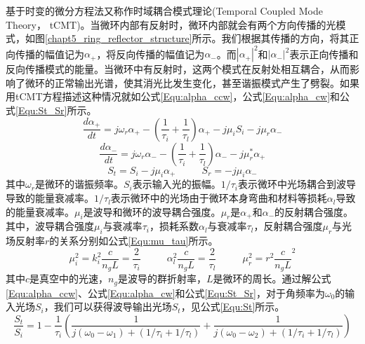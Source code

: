 基于时变的微分方程法又称作时域耦合模式理论(Temporal Coupled Mode Theory， tCMT)。当微环内部有反射时，微环内部就会有两个方向传播的光模式，如图\ref{chapt5_ring_reflector_structure}所示。我们根据其传播的方向，将其正向传播的幅值记为$\alpha_+$，将反向传播的幅值记为$\alpha_-$。而$|\alpha_+|^2$和$|\alpha_-|^2$表示正向传播和反向传播模式的能量。当微环中有反射时，这两个模式在反射处相互耦合，从而影响了微环的正常输出光谱，使其消光比发生变化，甚至谐振模式产生了劈裂。如果用tCMT方程描述这种情况就如公式\ref{Equ:alpha_ccw}，公式\ref{Equ:alpha_cw}和公式\ref{Equ:St_Sr}所示\cite{Li2016design}。
\begin{equation}
\label{Equ:alpha_ccw}
\frac{d\alpha_+}{dt}=j\omega_r\alpha_+-\left(\frac{1}{\tau_i}+\frac{1}{\tau_l}\right)\alpha_+-j\mu_iS_i-j\mu_r\alpha_-
\end{equation}
\begin{equation}
\label{Equ:alpha_cw}
\frac{d\alpha_-}{dt}=j\omega_r\alpha_--\left(\frac{1}{\tau_i}+\frac{1}{\tau_l}\right)\alpha_--j\mu_r^*\alpha_+
\end{equation}
\begin{equation}
\label{Equ:St_Sr}
S_t = S_i-j\mu_i\alpha_+ ~~~~~~~~~~~~ S_r = -j\mu_i\alpha_-
\end{equation}
其中$\omega_r$是微环的谐振频率。$S_i$表示输入光的振幅。$1/\tau_i$表示微环中光场耦合到波导导致的能量衰减率。$1/\tau_l$表示微环中的光场由于微环本身弯曲和材料等损耗$\alpha_l$导致的能量衰减率。$\mu_i$是波导和微环的波导耦合强度。$\mu_r$是$\alpha_+$和$\alpha_-$的反射耦合强度。其中，波导耦合强度$\mu_i$与衰减率$\tau_i$，损耗系数$\alpha_l$与衰减率$\tau_l$，反射耦合强度$\mu_r$与光场反射率$r$的关系分别如公式\ref{Equ:mu_tau}所示\cite{little1997microring}。
\begin{equation}
\label{Equ:mu_tau}
\mu_i^2=k_i^2\frac{c}{n_gL}=\frac{2}{\tau_i}~~~~~~~~~~~~\alpha_l^2\frac{c}{n_gL}=\frac{2}{\tau_l}~~~~~~~~~~~~\mu_r^2=r^2\frac{c}{n_gL}^2
\end{equation}
其中$c$是真空中的光速，$n_g$是波导的群折射率，$L$是微环的周长。通过解公式\ref{Equ:alpha_ccw}、公式\ref{Equ:alpha_cw}和公式\ref{Equ:St_Sr}，对于角频率为$\omega_0$的输入光场$S_i$，我们可以获得波导输出光场$S_t$，见公式\ref{Equ:St}所示。
\begin{equation}
\label{Equ:St}
\frac{S_t}{S_i}=1-\frac{1}{\tau_i}\left(\frac{1}{j(\omega_0-\omega_1)+(1/\tau_i+1/\tau_l)} + \frac{1}{j(\omega_0-\omega_2)+(1/\tau_i+1/\tau_l)}\right)
\end{equation}

